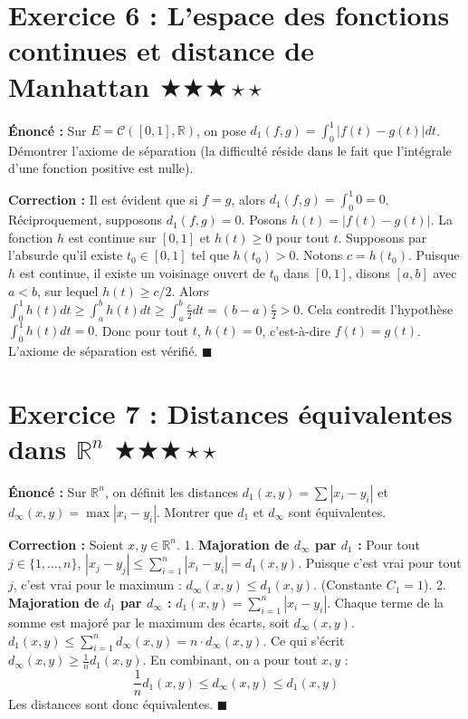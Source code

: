 \documentclass[11pt,a4paper]{article}
\begin{document}
\section*{Exercice 6 : L'espace des fonctions continues et distance de Manhattan \quad $\bigstar\bigstar\bigstar\star\star$}

\textbf{Énoncé :}
Sur $E = \mathcal{C}([0, 1], \mathbb{R})$, on pose $d_1(f, g) = \int_0^1 |f(t) - g(t)| dt$.
Démontrer l'axiome de séparation (la difficulté réside dans le fait que l'intégrale d'une fonction positive est nulle).

\textbf{Correction :}
Il est évident que si $f=g$, alors $d_1(f,g) = \int_0^1 0 = 0$.
Réciproquement, supposons $d_1(f,g) = 0$. Posons $h(t) = |f(t) - g(t)|$.
La fonction $h$ est continue sur $[0,1]$ et $h(t) \ge 0$ pour tout $t$.
Supposons par l'absurde qu'il existe $t_0 \in [0,1]$ tel que $h(t_0) > 0$. Notons $c = h(t_0)$.
Puisque $h$ est continue, il existe un voisinage ouvert de $t_0$ dans $[0,1]$, disons $[a,b]$ avec $a<b$, sur lequel $h(t) \ge c/2$.
Alors $\int_0^1 h(t) dt \ge \int_a^b h(t) dt \ge \int_a^b \frac{c}{2} dt = (b-a)\frac{c}{2} > 0$.
Cela contredit l'hypothèse $\int_0^1 h(t) dt = 0$.
Donc pour tout $t$, $h(t)=0$, c'est-à-dire $f(t)=g(t)$. L'axiome de séparation est vérifié. $\blacksquare$


\section*{Exercice 7 : Distances équivalentes dans $\mathbb{R}^n$ \quad $\bigstar\bigstar\bigstar\star\star$}

\textbf{Énoncé :}
Sur $\mathbb{R}^n$, on définit les distances $d_1(x,y) = \sum |x_i - y_i|$ et $d_\infty(x,y) = \max |x_i - y_i|$.
Montrer que $d_1$ et $d_\infty$ sont équivalentes.

\textbf{Correction :}
Soient $x, y \in \mathbb{R}^n$.
1. \textbf{Majoration de $d_\infty$ par $d_1$ :}
   Pour tout $j \in \{1, \dots, n\}$, $|x_j - y_j| \le \sum_{i=1}^n |x_i - y_i| = d_1(x,y)$.
   Puisque c'est vrai pour tout $j$, c'est vrai pour le maximum :
   $d_\infty(x,y) \le d_1(x,y)$. (Constante $C_1 = 1$).
2. \textbf{Majoration de $d_1$ par $d_\infty$ :}
   $d_1(x,y) = \sum_{i=1}^n |x_i - y_i|$.
   Chaque terme de la somme est majoré par le maximum des écarts, soit $d_\infty(x,y)$.
   $d_1(x,y) \le \sum_{i=1}^n d_\infty(x,y) = n \cdot d_\infty(x,y)$.
   Ce qui s'écrit $d_\infty(x,y) \ge \frac{1}{n} d_1(x,y)$.
En combinant, on a pour tout $x,y$ :
$$ \frac{1}{n} d_1(x,y) \le d_\infty(x,y) \le d_1(x,y) $$
Les distances sont donc équivalentes. $\blacksquare$
\end{document}
